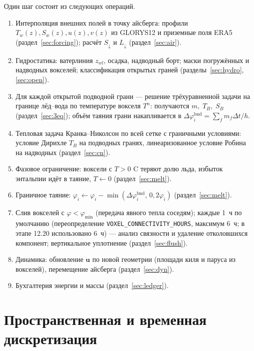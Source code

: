 \documentclass[12pt,a4paper]{article}
\newcommand{\code}[1]{\texttt{\small #1}}
\begin{document}
Один шаг состоит из следующих операций.
\begin{enumerate}
\item Интерполяция внешних полей в точку айсберга: профили $T_w(z),S_w(z),u(z),v(z)$ из GLORYS12 и приземные поля ERA5 (раздел~\ref{sec:forcing}); расчёт $S_\downarrow$ и $L_\downarrow$ (раздел~\ref{sec:air}).
\item Гидростатика: ватерлиния $z_{wl}$, осадка, надводный борт; маски погружённых и надводных вокселей; классификация открытых граней (разделы~\ref{sec:hydro}, \ref{sec:open}).
\item Для каждой открытой подводной грани --- решение трёхуравненной задачи на границе лёд--вода по температуре вокселя $T^n$: получаются $m,\;T_B,\;S_B$ (раздел~\ref{sec:3eq}); объём таяния грани накапливается в $\Delta\varphi^{\mathrm{bnd}}_i=\sum_f m_f\Delta t/h$.
\item Тепловая задача Кранка--Николсон по всей сетке с граничными условиями: условие Дирихле $T_B$ на подводных гранях, линеаризованное условие Робина на надводных (раздел~\ref{sec:cn}).
\item Фазовое ограничение: воксели с $T>0$ \textdegree C теряют долю льда, избыток энтальпии идёт в таяние, $T\leftarrow0$ (раздел~\ref{sec:melt}).
\item Граничное таяние: $\varphi_i\leftarrow\varphi_i-\min(\Delta\varphi^{\mathrm{bnd}}_i,\,0{,}2\varphi_i)$ (раздел~\ref{sec:melt}).
\item Слив вокселей с $\varphi<\varphi_{\min}$ (передача явного тепла соседям); каждые 1~ч по умолчанию (переопределение \code{VOXEL\_CONNECTIVITY\_HOURS}, максимум 6~ч; в этапе 12.20 использовано 6~ч) --- анализ связности и удаление отколовшихся компонент; вертикальное уплотнение (раздел~\ref{sec:flush}).
\item Динамика: обновление $\mathbf u$ по новой геометрии (площади киля и паруса из вокселей), перемещение айсберга (раздел~\ref{sec:dyn}).
\item Бухгалтерия энергии и массы (раздел~\ref{sec:ledger}).
\end{enumerate}

\section{Пространственная и временная дискретизация}\label{sec:grid}
\end{document}
